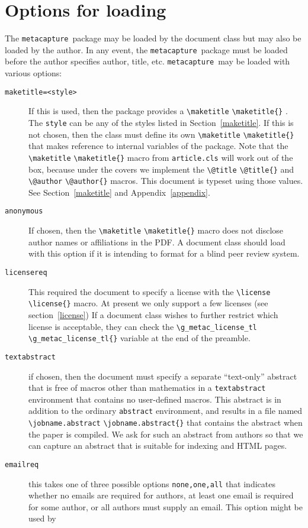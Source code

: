 \documentclass{article}
\newcommand{\pkgname}{\texttt{metacapture}}
\newcommand{\cmd}[2][]{%
  \def\FirstArg{#1}%
  \ifx\FirstArg\empty%
    \texttt{\textbackslash{}#2}%
  \else%
    \texttt{\textbackslash{}#2\{#1\}}%
  \fi
}
\begin{document}
\section{Options for loading}
The \pkgname\ package may be loaded by the document class but may also be loaded by the
author. In any event, the \pkgname\ package must be loaded before the author specifies
author, title, etc. \pkgname\  may be loaded with various options:
\begin{description}
\item[\texttt{maketitle=\textless{style}\textgreater}]
If this is used, then the package provides
a \cmd{maketitle}. The \texttt{style} can be any of the styles listed
in Section~\ref{maketitle}.  If this is not chosen, then the class
must define its own \cmd{maketitle} that makes reference to internal variables
of the package. Note that the \cmd{maketitle} macro from \texttt{article.cls} will
work out of the box, because under the covers we implement the \cmd{@title} and
\cmd{@author} macros. This document is typeset using those values. See Section~\ref{maketitle} and
Appendix~\ref{appendix}.
\item[\texttt{anonymous}] If chosen, then the \cmd{maketitle} macro does not disclose
author names or affiliations in the PDF. A document class should load
with this option if it is intending to format for a blind peer review
system.
\item[\texttt{licensereq}] This required the document to specify
a license with the \cmd{license} macro.  At present we only support a
few licenses (see section~\ref{license}) If a document class wishes to
further restrict which license is acceptable, they can check
the \cmd{g\_metac\_license\_tl} variable at the end of the preamble.
\item[\texttt{textabstract}] if chosen, then the document must specify a
separate ``text-only'' abstract that is free of macros other than
mathematics in a \texttt{textabstract}
environment that contains no user-defined macros. This abstract is in
addition to the ordinary \texttt{abstract} environment, and results in a file
named \cmd{jobname.abstract} that contains the abstract when the paper is compiled.
We ask for such an abstract from authors so that we can capture an abstract
that is suitable for indexing and HTML pages.
\item[\texttt{emailreq}] this takes one of three possible options \texttt{none,one,all} that indicates whether
no emails are required for authors, at least one email is required for
some author, or all authors must supply an email. This option might be used by

\end{description}
\end{document}

